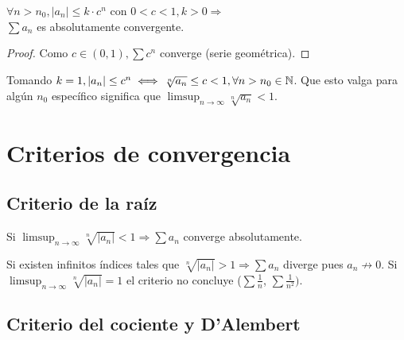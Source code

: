 \begin{corollary}
  $\forall n > n_0, |a_n| \leq k \cdot c^n$ con $0 < c < 1, k > 0 \Rightarrow$ \\
  $\sum a_n$ es absolutamente convergente. 
  \begin{proof}
    Como $c \in (0, 1), \sum c^n$ converge (serie geométrica).
  \end{proof}
\end{corollary}

\begin{note}
  Tomando $k = 1, |a_n| \leq c^n \iff \sqrt[n]{a_n} \leq c < 1, \forall n > n_0 \in \mathbb{N}$. Que esto valga para algún $n_0$ específico significa que $\limsup_{n \to \infty} \sqrt[n]{a_n} < 1$. 
\end{note}

\section{Criterios de convergencia}

\subsection{Criterio de la raíz}

\begin{corollary}
  Si $\limsup_{n \to \infty} \sqrt[n]{|a_n|} < 1 \Rightarrow \sum a_n$ converge absolutamente.
  \begin{note}
    Si existen infinitos índices tales que $\sqrt[n]{|a_n|} > 1 \Rightarrow \sum a_n$ diverge pues $a_n \not \to 0$.
    Si $\limsup_{n \to \infty} \sqrt[n]{|a_n|} = 1$ el criterio no concluye ($\sum \frac{1}{n}$, $\sum \frac{1}{n^2})$.
  \end{note}
\end{corollary}

\subsection{Criterio del cociente y D'Alembert}

